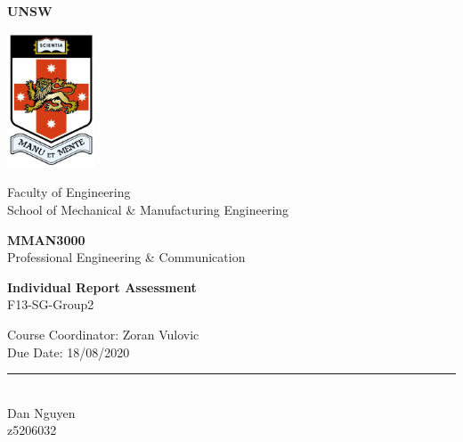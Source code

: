 \documentclass[11pt, a4, nocenter, margin=150mm]{article}
\begin{document}
\onehalfspacing
\begin{titlepage}
	\begin{center}
		\Huge
		\textbf{UNSW} \\

		\vspace{5mm}

		\includegraphics[height=4cm]{unsw-logo.jpg}

		\vspace{5mm}

		\Large
		Faculty of Engineering \\
		School of Mechanical \& Manufacturing Engineering \\

		\vspace{10mm}

		\textbf{MMAN3000} \\
		Professional Engineering \& Communication \\

		\vspace{15mm}

		\LARGE
		\textbf{Individual Report Assessment} \\
		F13-SG-Group2

		\vspace{15mm}

		\Large
		Course Coordinator: Zoran Vulovic\\
		Due Date: 18/08/2020 \\

		\vfill
		\rule{\linewidth}{0.5pt} \\

		\Large
		Dan Nguyen \\

		\large
		z5206032 \\

	\end{center}
\end{titlepage}

\tableofcontents
\vspace{1cm}
\listoffigures
\vspace{1cm}
\listoftables
\pagebreak
\end{document}
